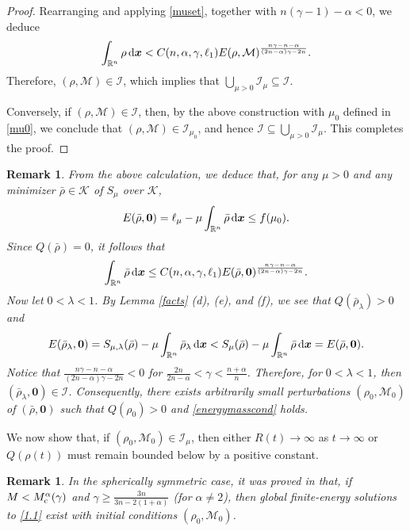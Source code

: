 \documentclass[reqno,11pt]{amsart}
\numberwithin{equation}{section}
\newtheorem{remark}[theorem]{Remark}
\theoremstyle{definition}
\def\dd{{\, \rm d}}
\begin{document}
\begin{proof}
Rearranging and applying \eqref{muset}, together with $n(\gamma - 1) - \alpha < 0$, we deduce
    \[
 \int_{\mathbb{R}^n} \rho \dd \boldsymbol{x} < C(n,\alpha,\gamma,\ell_1)
 E(\rho,\mathcal{M})^\frac{n\gamma - n - \alpha}{(2n - \alpha)\gamma - 2n}.
    \]
Therefore, $(\rho,\mathcal{M}) \in \mathcal{I}$, which implies that
    $\bigcup_{\mu > 0} \mathcal{I}_\mu \subseteq \mathcal{I}$. 

    Conversely, if $(\rho,\mathcal{M}) \in \mathcal{I}$, then, by the above construction with $\mu_0$ defined in \eqref{mu0}, we conclude that $(\rho,\mathcal{M}) \in \mathcal{I}_{\mu_0}$, and hence
    $\mathcal{I} \subseteq \bigcup_{\mu > 0} \mathcal{I}_\mu$. 
    This completes the proof.
\end{proof}

\begin{remark}
From the above calculation, we deduce that, 
    for any $\mu > 0$ and any minimizer $\bar{\rho} \in \mathcal{K}$ of $S_\mu$ over $\mathcal{K}$, 
    \[
 E(\bar{\rho},\boldsymbol{0}) = \ell_\mu - \mu \int_{\mathbb{R}^n} \bar{\rho} \dd \boldsymbol{x} \leq f(\mu_0).
    \]
Since $Q(\bar{\rho}) = 0$, it follows that
\[
\int_{\mathbb{R}^n} \bar{\rho} \dd \boldsymbol{x} \leq C(n,\alpha,\gamma,\ell_1)
 E(\bar{\rho},\boldsymbol{0})^\frac{n\gamma - n - \alpha}{(2n - \alpha)\gamma - 2n}.
 \]
 Now let $0< \lambda < 1$. By {\rm Lemma \ref{facts} (d), (e)}, and {\rm(f)}, 
 we see that $Q(\bar\rho_\lambda) > 0$ and 
 $$
 E(\bar\rho_\lambda,\boldsymbol{0}) = S_{\mu,\lambda}(\bar\rho) 
 - \mu \int_{\mathbb{R}^n} \bar\rho_\lambda \dd \boldsymbol{x} < S_{\mu}(\bar\rho) 
 - \mu \int_{\mathbb{R}^n} \bar\rho \dd \boldsymbol{x} = E(\bar\rho,\boldsymbol{0}).
 $$
 Notice that $\frac{n\gamma - n - \alpha}{(2n - \alpha)\gamma - 2n} < 0$
 for $\frac{2n}{2n-\alpha} < \gamma < \frac{n+\alpha}{n}$.
 Therefore, for $0<\lambda<1$, then $(\bar\rho_\lambda,\boldsymbol{0}) \in \mathcal{I}$. 
 Consequently, there exists arbitrarily small perturbations $(\rho_0,\mathcal{M}_0)$ 
 of $(\bar{\rho},\boldsymbol{0})$ such that $Q(\rho_0) > 0$ and \eqref{energymasscond} holds. 
\end{remark}

\smallskip
We now show that, if $(\rho_0,\mathcal{M}_0) \in \mathcal{I}_\mu$, 
then either $R(t) \to \infty$ as $t \to \infty$ or $Q(\rho(t))$ 
must remain bounded below by a positive constant.

\begin{remark}
In the 
spherically symmetric case,  it was proved in {\rm\cite{Carrillo2025}} that, if
$M < M^\alpha_{\rm c}(\gamma)$
and $\gamma \geq \frac{3n}{3n - 2(1+\alpha)}$ {\rm (}for $\alpha \neq 2${\rm )}, 
then global finite-energy solutions to \eqref{1.1} exist 
with initial conditions $(\rho_0,\mathcal{M}_0)$.
\end{remark}
\end{document}
